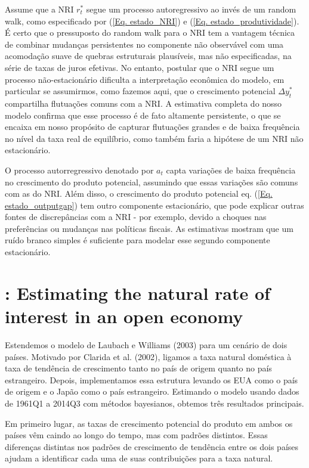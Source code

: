 Assume que a NRI $r_t^{*}$ segue um processo autoregressivo ao invés de um random walk, como especificado por (\ref{Eq. estado_NRI}) e (\ref{Eq. estado_produtividade}). É certo que o pressuposto do random walk para o NRI tem a vantagem técnica de combinar mudanças persistentes no componente não observável com uma acomodação suave de quebras estruturais plausíveis, mas não especificadas, na série de taxas de juros efetivas. No entanto, postular que o NRI segue um processo não-estacionário dificulta a interpretação econômica do modelo, em particular se assumirmos, como fazemos aqui, que o crescimento potencial $\Delta y_t^{*}$ compartilha flutuações comuns com a NRI. A estimativa completa do nosso modelo confirma que esse processo é de fato altamente persistente, o que se encaixa em nosso propósito de capturar flutuações grandes e de baixa frequência no nível da taxa real de equilíbrio, como também faria a hipótese de um NRI não estacionário.

O processo autorregressivo denotado por $a_t$ capta variações de baixa frequência no crescimento do produto potencial, assumindo que essas variações são comuns com as do NRI. Além disso, o crescimento do produto potencial eq. (\ref{Eq. estado_outputgap}) tem outro componente estacionário, que pode explicar outras fontes de discrepâncias com a NRI - por exemplo, devido a choques nas preferências ou mudanças nas políticas fiscais. As estimativas mostram que um ruído branco simples é suficiente para modelar esse segundo componente estacionário.
%
%
\section{\citet{Wynneb:2018}: Estimating the natural rate of interest in an open economy }
Estendemos o modelo de Laubach e Williams (2003) para um cenário de dois países. Motivado por Clarida et al. (2002), ligamos a taxa natural doméstica à taxa de tendência de crescimento tanto no país de origem quanto no país estrangeiro. Depois, implementamos essa estrutura levando os EUA como o país de origem e o Japão como o país estrangeiro. Estimando o modelo usando dados de 1961Q1 a 2014Q3 com métodos bayesianos, obtemos três resultados principais.

Em primeiro lugar, as taxas de crescimento potencial do produto em ambos os países vêm caindo ao longo do tempo, mas com padrões distintos. Essas diferenças distintas nos padrões de crescimento de tendência entre os dois países ajudam a identificar cada uma de suas contribuições para a taxa natural.

